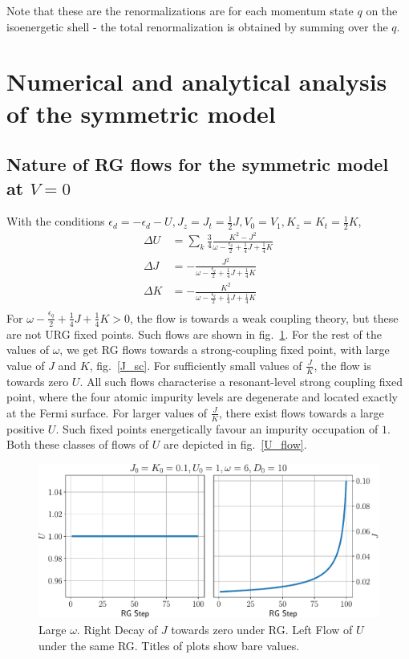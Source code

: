 \documentclass[twoside,11pt]{report}
\numberwithin{equation}{section}
\begin{document}
Note that these are the renormalizations are for each momentum state \(q\) on the isoenergetic shell - the total renormalization is obtained by summing over the \(q\).
\section{Numerical and analytical analysis of the symmetric model}
\subsection{Nature of RG flows for the symmetric model at \(V = 0\)}
With the conditions \(\epsilon_d = -\epsilon_d - U, J_z = J_t = \frac{1}{2}J, V_0 = V_1, K_z = K_t = \frac{1}{2}K\),
\begin{equation}\begin{aligned}
	\Delta U &= \sum_k \frac{3}{4}\frac{K^2 - J^2}{\omega - \frac{\epsilon_q}{2} + \frac{1}{4}J + \frac{1}{4}K} \\
	\Delta J &= - \frac{J^2}{\omega - \frac{\epsilon_q}{2} + \frac{1}{4}J + \frac{1}{4}K}\\
	\Delta K &= - \frac{K^2}{\omega - \frac{\epsilon_q}{2} + \frac{1}{4}J + \frac{1}{4}K}\\
\end{aligned}\end{equation}
For \(\omega - \frac{\epsilon_q}{2} + \frac{1}{4}J + \frac{1}{4}K > 0\), the flow is towards a weak coupling theory, but these are not URG fixed points. Such flows are shown in fig.~\ref{Jdecay}. For the rest of the values of \(\omega\), we get RG flows towards a strong-coupling fixed point, with large value of \(J\) and \(K\), fig.~\ref{J_sc}. For sufficiently small values of \(\frac{J}{K}\), the flow is towards zero \(U\). All such flows characterise a resonant-level strong coupling fixed point, where the four atomic impurity levels are degenerate and located exactly at the Fermi surface. For larger values of \(\frac{J}{K}\), there exist flows towards a large positive \(U\). Such fixed points energetically favour an impurity occupation of \(1\). Both these classes of flows of \(U\) are depicted in fig.~\ref{U_flow}.
\begin{figure}[htpb]
	\centering
	\includegraphics[width=\textwidth]{../figures/large_w.pdf}
	\caption{Large \(\omega\). Right Decay of \(J\) towards zero under RG. Left Flow of \(U\) under the same RG. Titles of plots show bare values.}
	\label{Jdecay}
\end{figure}
\end{document}
